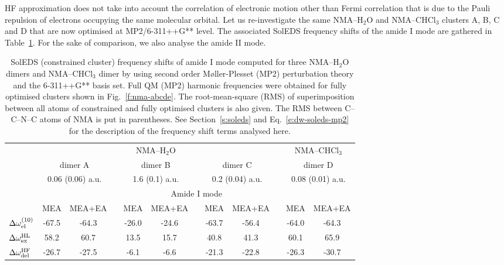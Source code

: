 \documentclass[b5paper,oneside,fleqn,11pt]{book}
\begin{document}
\begin{refsection}
HF approximation does not take into account the correlation
of electronic motion other than Fermi correlation
that is due to the Pauli repulsion of electrons occupying the same
molecular orbital. Let us re-investigate the same NMA--H$_2$O
and NMA--CHCl$_3$ clusters A, B, C and D that are now optimised
at MP2/6-311++G** level. The associated SolEDS frequency shifts
of the amide I mode are gathered in Table~\ref{t:mp2-soleds-amide-I}.
For the sake of comparison, we also analyse the amide II mode.
%
\begin{table}%
\caption{
SolEDS (constrained cluster) frequency shifts of amide I mode computed for three NMA--H$_2$O dimers 
and NMA--CHCl$_3$ dimer by using second
order M{\o}ller-Plesset (MP2) perturbation theory and the 6-311++G** basis set. 
Full QM (MP2) harmonic
frequencies were obtained for fully optimised clusters shown in Fig.~\ref{f:nma-abcde}. 
The root\hyp{}mean\hyp{}square (RMS) of
superimposition between all atoms of constrained and fully optimised clusters is also given. The RMS between
C--C--N--C atoms of NMA is put in parentheses. See Section~\ref{s:soleds} and Eq.~\eqref{e:dw-soleds-mp2}
for the description of the frequency shift terms analysed here.
\label{t:mp2-soleds-amide-I}}
\begin{tabular*}{1.0\textwidth}{@{\extracolsep{\fill} } l ccccccccccc }
\hline\hline
 & \multicolumn{8}{c}{NMA--H$_2$O} && \multicolumn{2}{c}{NMA--CHCl$_3$} \\
\cline{2-9}
\cline{11-12}
 & \multicolumn{2}{c}{dimer A} && 
    \multicolumn{2}{c}{dimer B} && 
    \multicolumn{2}{c}{dimer C} && 
    \multicolumn{2}{c}{dimer D} \\
 & \multicolumn{2}{c}{0.06 (0.06) a.u.} && 
    \multicolumn{2}{c}{1.6 (0.1) a.u.}   && 
    \multicolumn{2}{c}{0.2 (0.04) a.u.}  && 
    \multicolumn{2}{c}{0.08 (0.01) a.u.} \\
\cline{2-12}
 & \multicolumn{11}{c}{Amide I mode} \\
\cline{2-12}
 & MEA & MEA+EA &&  MEA & MEA+EA && MEA & MEA+EA && MEA & MEA+EA \\
\hline
 $\Delta \omega_{{\rm el}}^{(10)}$      & -67.5  & -64.3   && -26.0  & -24.6   && -63.7  & -56.4  && -64.0 & -64.3 \\
 $\Delta \omega_{{\rm ex}}^{\rm HL}$    &  58.2  &  60.7   &&  13.5  &  15.7   &&  40.8  &  41.3  &&  60.1 &  65.9 \\
 $\Delta \omega_{{\rm del}}^{\rm HF}$   & -26.7  & -27.5   &&  -6.1  &  -6.6   && -21.3  & -22.8  && -26.3 & -30.7 \\

\end{tabular*}
\end{table}
\end{refsection}
\end{document}
